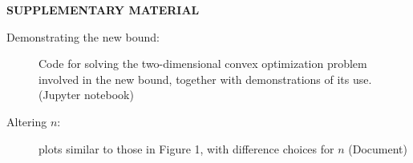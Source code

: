 \documentclass[12pt]{article}
\theoremstyle{plain}
\begin{document}
\bigskip
\begin{center}
{\large\bf SUPPLEMENTARY MATERIAL}
\end{center}

\begin{description}

\item[Demonstrating the new bound:] Code for solving the two-dimensional convex optimization problem involved in the new bound, together with demonstrations of its use.  (Jupyter notebook)

\item[Altering $n$:] plots similar to those in Figure 1, with difference choices for $n$ (Document)

\end{description}


\end{document}
